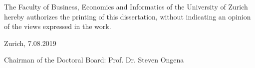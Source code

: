 \thispagestyle{empty}


\noindent
The Faculty of Business, Economics and Informatics of the University of Zurich hereby authorizes the printing of this dissertation, without indicating an opinion of the views expressed in the work.

\bigskip

\noindent
Zurich, 7.08.2019 %

\bigskip

\noindent
Chairman of the Doctoral Board: Prof. Dr. Steven Ongena


\medskip
